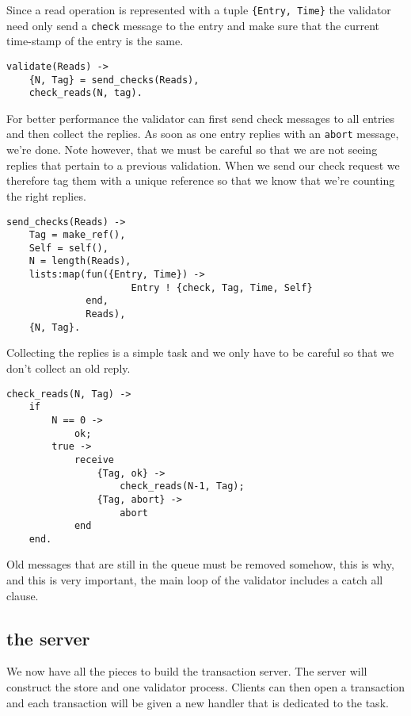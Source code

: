 \documentclass[a4paper, 11pt]{article}
\begin{document}
Since a read operation is represented with a tuple {\tt \{Entry,
  Time\}} the validator need only send a {\tt check} message to the
entry and make sure that the current time-stamp of the entry is the
same. 

\begin{verbatim}
validate(Reads) ->
    {N, Tag} = send_checks(Reads),
    check_reads(N, tag).
\end{verbatim}

For better performance the validator can first send check messages to
all entries and then collect the replies. As soon as one entry replies
with an {\tt abort} message, we're done. Note however, that we must be
careful so that we are not seeing replies that pertain to a previous
validation. When we send our check request we therefore tag them with
a unique reference so that we know that we're counting the right replies.

\begin{verbatim}
send_checks(Reads) ->
    Tag = make_ref(),
    Self = self(),
    N = length(Reads),
    lists:map(fun({Entry, Time}) -> 
                      Entry ! {check, Tag, Time, Self}
              end, 
              Reads),
    {N, Tag}.
\end{verbatim}

Collecting the replies is a simple task and we only have to be
careful so that we don't collect an old reply.

\begin{verbatim}
check_reads(N, Tag) ->
    if 
        N == 0 ->
            ok;
        true ->
            receive
                {Tag, ok} ->
                    check_reads(N-1, Tag);
                {Tag, abort} ->
                    abort
            end
    end.
\end{verbatim}

Old messages that are still in the queue must be removed somehow, this
is why, and this is very important, the main loop of the validator
includes a catch all clause. 

\subsection{the server}

We now have all the pieces to build the transaction server. The server
will construct the store and one validator
process. Clients can then open a transaction and each transaction will
be given a new handler that is dedicated to the task.
\end{document}
